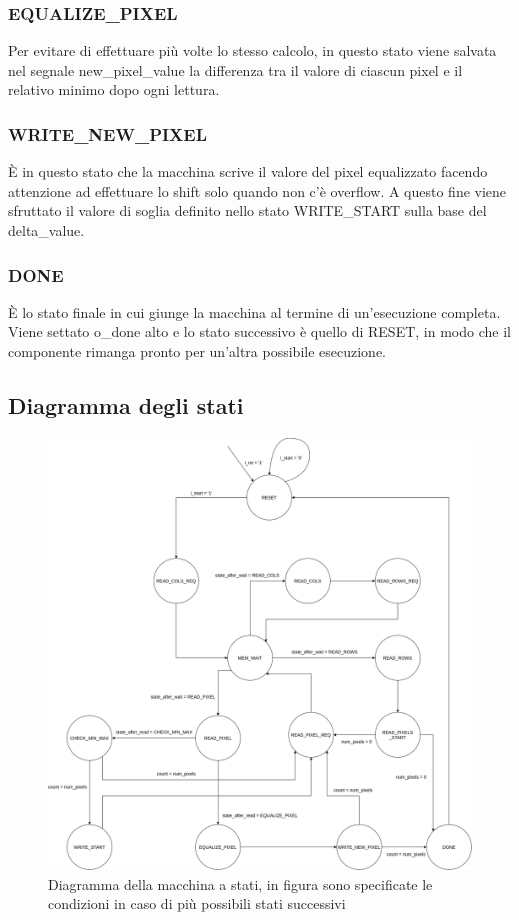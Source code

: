 \documentclass{article}
\begin{document}
\subsubsection{EQUALIZE\_PIXEL}
Per evitare di effettuare più volte lo stesso calcolo, in questo stato viene salvata nel segnale new\_pixel\_value la differenza tra il valore di ciascun pixel e il relativo minimo dopo ogni lettura.

\subsubsection{WRITE\_NEW\_PIXEL}
È in questo stato che la macchina scrive il valore del pixel equalizzato facendo attenzione ad effettuare lo shift solo quando non c'è overflow. A questo fine viene sfruttato il valore di soglia definito nello stato WRITE\_START sulla base del delta\_value.

\subsubsection{DONE}
È lo stato finale in cui giunge la macchina al termine di un'esecuzione completa. Viene settato o\_done alto e lo stato successivo è quello di RESET, in modo che il componente rimanga pronto per un'altra possibile esecuzione.

\subsection{Diagramma degli stati}

\begin{figure}[h]
    \includegraphics[scale=0.26]{diagram.png}
    \centering
    \caption{Diagramma della macchina a stati, in figura sono specificate le condizioni in caso di più possibili stati successivi}
\end{figure}
\end{document}
